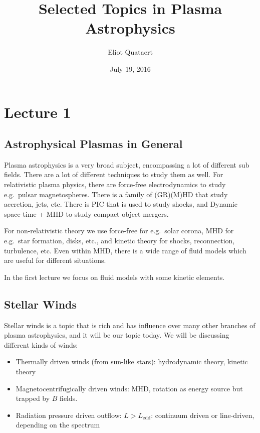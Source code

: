 \documentclass[letterpaper, 11pt]{article}
\numberwithin{equation}{section}
\numberwithin{figure}{section}
\begin{document}
\title{Selected Topics in Plasma Astrophysics}
\author{Eliot Quataert}
\date{July 19, 2016}

\maketitle

\section{Lecture 1}

\subsection{Astrophysical Plasmas in General}

Plasma astrophysics is a very broad subject, encompassing a lot of different sub
fields. There are a lot of different techniques to study them as well. For
relativistic plasma physics, there are force-free electrodynamics to study e.g.\
pulsar magnetospheres. There is a family of (GR)(M)HD that study accretion,
jets, etc. There is PIC that is used to study shocks, and Dynamic space-time +
MHD to study compact object mergers.

For non-relativistic theory we use force-free for e.g.\ solar corona, MHD for
e.g.\ star formation, disks, etc., and kinetic theory for shocks, reconnection,
turbulence, etc. Even within MHD, there is a wide range of fluid models which
are useful for different situations.

In the first lecture we focus on fluid models with some kinetic elements.

\subsection{Stellar Winds}

Stellar winds is a topic that is rich and has influence over many other branches
of plasma astrophysics, and it will be our topic today. We will be discussing
different kinds of winds:
\begin{itemize}
    \item Thermally driven winds (from sun-like stars): hydrodynamic theory, kinetic
  theory
    \item Magnetocentrifugically driven winds: MHD, rotation as energy source
      but trapped by $B$ fields.
    \item Radiation pressure driven outflow: $L > L_\mathrm{edd}$: continuum
      driven or line-driven, depending on the spectrum
\end{itemize}
\end{document}

